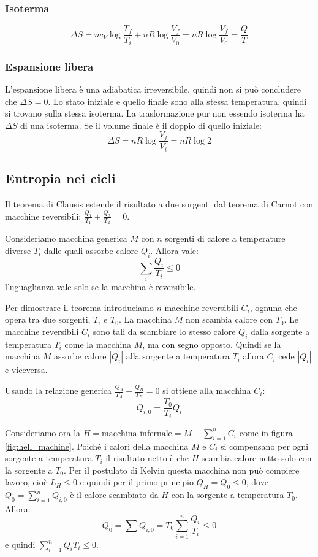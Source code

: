 \subsubsection{Isoterma}
\[\Delta S=nc_V\log\frac{T_f}{T_i}+nR\log\frac{V_f}{V_0}=nR\log\frac{V_f}{V_0}=\frac{Q}{T}\]
\subsubsection{Espansione libera}
L'espansione libera è una adiabatica irreversibile, quindi non si può concludere che $\Delta S=0$. Lo stato iniziale e quello finale sono alla stessa temperatura, quindi si trovano sulla stessa isoterma. La trasformazione pur non essendo isoterma ha $\Delta S$ di una isoterma. Se il volume finale è il doppio di quello iniziale:
\[\Delta S=nR\log\frac{V_f}{V_i}=nR\log 2\]

\subsection{Entropia nei cicli}
Il teorema di Clausis estende il risultato a due sorgenti dal teorema di Carnot con macchine reversibili: $\frac{Q_1}{T_1} + \frac{Q_2}{T_2} = 0$.
\begin{Teo}[Clausius]
 Consideriamo macchina generica $M$ con $n$ sorgenti di calore a temperature diverse $T_i$ dalle quali assorbe calore $Q_i$. Allora vale:
  \begin{equation}
   \sum_i \frac{Q_i}{T_i} \leq 0
  \end{equation}
l'uguaglianza vale solo se la macchina è reversibile.
\end{Teo}

Per dimostrare il teorema introduciamo $n$ macchine reversibili $C_i$, ognuna che opera tra due sorgenti, $T_i$ e $T_0$. La macchina $M$ non scambia calore con $T_0$. Le macchine reversibili $C_i$ sono tali da scambiare lo stesso calore $Q_i$ dalla sorgente a temperatura $T_i$ come la macchina $M$, ma con segno opposto. Quindi se la macchina $M$ assorbe calore $|Q_i|$ alla sorgente a temperatura $T_i$ allora $C_i$ cede $|Q_i|$ e viceversa.

Usando la relazione generica $\frac{Q_A}{T_A} + \frac{Q_B}{T_B} = 0$ si ottiene alla macchina $C_i$:
\[
 Q_{i,0} = \frac{T_0}{T_i} Q_i
\]

Consideriamo ora la $H=\text{macchina infernale}=M+\sum_{i=1}^{n}C_i$ come in figura \ref{fig:hell_machine}. Poiché i calori della macchina $M$ e $C_i$ si compensano per ogni sorgente a temperatura $T_i$ il risultato netto è che $H$ scambia calore netto solo con la sorgente a $T_0$. Per il postulato di Kelvin questa macchina non può compiere lavoro, cioè $L_H \leq 0$ e quindi per il primo principio $Q_H = Q_0 \leq 0$, dove $Q_0 = \sum_{i=1}^n Q_{i,0}$ è il calore scambiato da $H$ con la sorgente a temperatura $T_0$. Allora:
\[
 Q_0 = \sum Q_{i,0} = T_0\sum_{i=1}^{n} \frac{Q_i}{T_i}\leq 0
\]
e quindi $\sum_{i=1}^n{Q_i}{T_i}\leq 0$.

